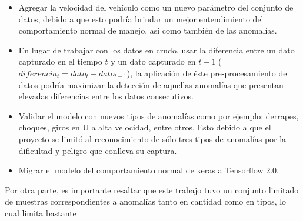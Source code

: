 \begin{itemize}
\item Agregar la velocidad del veh\'{i}culo como un nuevo par\'{a}metro del conjunto de datos, debido a que esto podr\'{i}a brindar un mejor entendimiento del comportamiento normal de manejo, as\'{i} como tambi\'{e}n de las anomal\'{i}as.
\item En lugar de trabajar con los datos en crudo, usar la diferencia entre un dato capturado en el tiempo $t$ y un dato capturado en $t-1$ ($diferencia_{t} = dato_{t}-dato_{t-1}$), la aplicaci\'{o}n de \'{e}ste pre-procesamiento de datos podr\'{i}a maximizar la detecci\'{o}n de aquellas anomal\'{i}as que presentan elevadas diferencias entre los datos consecutivos.
\item Validar el modelo con nuevos tipos de anomal\'{i}as como por ejemplo: derrapes, choques, giros en U a alta velocidad, entre otros. Esto debido a que el proyecto se limit\'{o} al reconocimiento de s\'{o}lo tres tipos de anomal\'{i}as por la dificultad y peligro que conlleva su captura.
\item Migrar el modelo del comportamiento normal de keras a Tensorflow 2.0.

\end{itemize}

Por otra parte, es importante resaltar que este trabajo tuvo un conjunto limitado de muestras correspondientes a anomal\'{i}as tanto en cantidad como en tipos, lo cual limita bastante 

 
